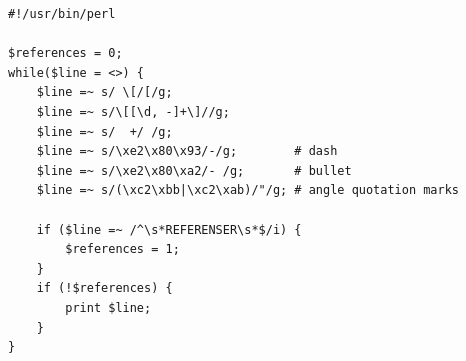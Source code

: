 \documentclass[a4paper]{report}
\begin{document}
\begin{appendices}
\begin{Code}
\begin{lstlisting}[frame=single]
\end{lstlisting}
\end{Code}

\begin{Code}
\begin{lstlisting}[frame=single]
#!/usr/bin/perl

$references = 0;
while($line = <>) {
    $line =~ s/ \[/[/g;
    $line =~ s/\[[\d, -]+\]//g;
    $line =~ s/  +/ /g;
    $line =~ s/\xe2\x80\x93/-/g;        # dash
    $line =~ s/\xe2\x80\xa2/- /g;       # bullet
    $line =~ s/(\xc2\xbb|\xc2\xab)/"/g; # angle quotation marks

    if ($line =~ /^\s*REFERENSER\s*$/i) {
        $references = 1;
    }
    if (!$references) {
        print $line;
    }
}
\end{lstlisting}
\end{Code}

\end{appendices}

\clearpage



\end{document}
